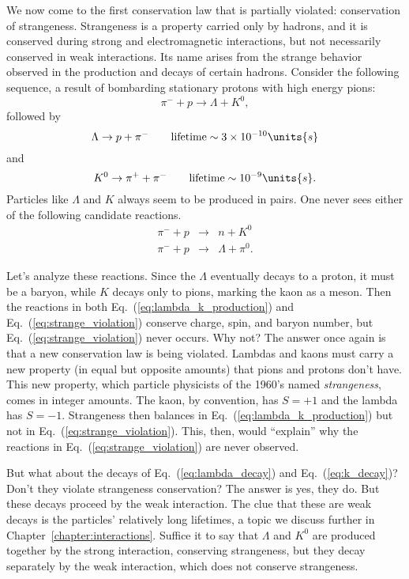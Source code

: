 We now come to the first conservation law that is partially violated:
conservation of strangeness.  Strangeness is a property carried
only by hadrons, and it is conserved during strong and electromagnetic
interactions, but not necessarily conserved in weak interactions.
Its name arises from the strange behavior observed in the production and
decays of certain hadrons.  Consider the following sequence, a result
of bombarding stationary protons with high energy pions:
\begin{equation}
\pi^- + p \to \Lambda + K^0,
\label{eq:lambda_k_production}
\end{equation}
followed by
\begin{equation}
\Lambda \to p + \pi^- \qquad \mbox{lifetime} \sim 3\times 10^{-10}\units{s}
\label{eq:lambda_decay}
\end{equation}
and
\begin{equation}
K^0 \to \pi^+ + \pi^- \qquad \mbox{lifetime} \sim 10^{-9}\units{s}.
\label{eq:k_decay}
\end{equation}
Particles like $\Lambda$ and $K$ always seem to be produced in pairs.
One never sees either of the following candidate reactions.
\begin{eqnarray}
\pi^- + p &\to& n + K^0 \nonumber\\
\pi^- + p &\to& \Lambda + \pi^0.
\label{eq:strange_violation}
\end{eqnarray}

Let's analyze these reactions.  Since the $\Lambda$ eventually decays
to a proton, it must be a baryon, while $K$ decays only to pions,
marking the kaon as a meson.  Then the reactions in both
Eq.~(\ref{eq:lambda_k_production}) and
Eq.~(\ref{eq:strange_violation}) conserve charge, spin, and baryon
number, but Eq.~(\ref{eq:strange_violation}) never occurs.  Why not?
The answer once again is that a new conservation law is being
violated.  Lambdas and kaons must carry a new property (in equal but
opposite amounts) that pions and protons don't have.  This new
property, which particle physicists of the 1960's named {\em
strangeness}, comes in integer amounts.  The kaon, by convention, has
$S = +1$ and the lambda has $S = -1$.  Strangeness then balances in
Eq.~(\ref{eq:lambda_k_production}) but not in
Eq.~(\ref{eq:strange_violation}).  This, then, would ``explain'' why
the reactions in Eq.~(\ref{eq:strange_violation}) are never observed.

But what about the decays of Eq.~(\ref{eq:lambda_decay}) and
Eq.~(\ref{eq:k_decay})?  Don't they violate strangeness
conservation?  The answer is yes, they do.  But these decays proceed
by the weak interaction.  The clue that these are weak decays is the
particles' relatively long lifetimes, a topic we discuss further in
Chapter~\ref{chapter:interactions}.  Suffice it to say that $\Lambda$
and $K^0$ are produced together by the strong interaction, conserving
strangeness, but they decay separately by the weak interaction,
which does not conserve strangeness.


